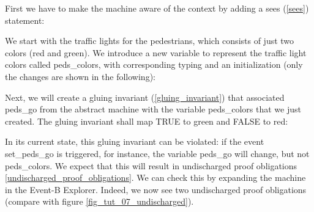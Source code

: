 First we have to make the machine aware of the context by adding a \textsf{sees} (\ref{sees}) statement:


We start with the traffic lights for the pedestrians, which consists of just two colors (red and green).  We introduce a new variable to represent the traffic light colors called \textsf{peds\_colors}, with corresponding typing and an initialization (only the changes are shown in the following):


Next, we will create a gluing invariant (\ref{gluing_invariant}) that associated \textsf{peds\_go} from the abstract machine with the variable \textsf{peds\_colors} that we just created.  The gluing invariant shall map \textsf{TRUE} to \textsf{green} and \textsf{FALSE} to \textsf{red}:


In its current state, this gluing invariant can be violated: if the event \textsf{set\_peds\_go} is triggered, for instance, the variable \textsf{peds\_go} will change, but not \textsf{peds\_colors}.  We expect that this will result in undischarged proof obligations \ref{undischarged_proof_obligations}.  We can check this by expanding the machine in the Event-B Explorer.  Indeed, we now see two undischarged proof obligations (compare with figure \ref{fig_tut_07_undischarged}).

